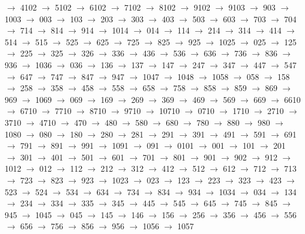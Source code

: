 $\rightarrow$ 4102 $\rightarrow$ 5102 $\rightarrow$ 6102 $\rightarrow$ 7102 $\rightarrow$ 8102 $\rightarrow$ 9102 $\rightarrow$ 9103 $\rightarrow$ 903 $\rightarrow$ 1003 $\rightarrow$ 003 $\rightarrow$ 103 $\rightarrow$ 203 $\rightarrow$ 303 $\rightarrow$ 403 $\rightarrow$ 503 $\rightarrow$ 603 $\rightarrow$ 703 $\rightarrow$ 704 $\rightarrow$ 714 $\rightarrow$ 814 $\rightarrow$ 914 $\rightarrow$ 1014 $\rightarrow$ 014 $\rightarrow$ 114 $\rightarrow$ 214 $\rightarrow$ 314 $\rightarrow$ 414 $\rightarrow$ 514 $\rightarrow$ 515 $\rightarrow$ 525 $\rightarrow$ 625 $\rightarrow$ 725 $\rightarrow$ 825 $\rightarrow$ 925 $\rightarrow$ 1025 $\rightarrow$ 025 $\rightarrow$ 125 $\rightarrow$ 225 $\rightarrow$ 325 $\rightarrow$ 326 $\rightarrow$ 336 $\rightarrow$ 436 $\rightarrow$ 536 $\rightarrow$ 636 $\rightarrow$ 736 $\rightarrow$ 836 $\rightarrow$ 936 $\rightarrow$ 1036 $\rightarrow$ 036 $\rightarrow$ 136 $\rightarrow$ 137 $\rightarrow$ 147 $\rightarrow$ 247 $\rightarrow$ 347 $\rightarrow$ 447 $\rightarrow$ 547 $\rightarrow$ 647 $\rightarrow$ 747 $\rightarrow$ 847 $\rightarrow$ 947 $\rightarrow$ 1047 $\rightarrow$ 1048 $\rightarrow$ 1058 $\rightarrow$ 058 $\rightarrow$ 158 $\rightarrow$ 258 $\rightarrow$ 358 $\rightarrow$ 458 $\rightarrow$ 558 $\rightarrow$ 658 $\rightarrow$ 758 $\rightarrow$ 858 $\rightarrow$ 859 $\rightarrow$ 869 $\rightarrow$ 969 $\rightarrow$ 1069 $\rightarrow$ 069 $\rightarrow$ 169 $\rightarrow$ 269 $\rightarrow$ 369 $\rightarrow$ 469 $\rightarrow$ 569 $\rightarrow$ 669 $\rightarrow$ 6610 $\rightarrow$ 6710 $\rightarrow$ 7710 $\rightarrow$ 8710 $\rightarrow$ 9710 $\rightarrow$ 10710 $\rightarrow$ 0710 $\rightarrow$ 1710 $\rightarrow$ 2710 $\rightarrow$ 3710 $\rightarrow$ 4710 $\rightarrow$ 470 $\rightarrow$ 480 $\rightarrow$ 580 $\rightarrow$ 680 $\rightarrow$ 780 $\rightarrow$ 880 $\rightarrow$ 980 $\rightarrow$ 1080 $\rightarrow$ 080 $\rightarrow$ 180 $\rightarrow$ 280 $\rightarrow$ 281 $\rightarrow$ 291 $\rightarrow$ 391 $\rightarrow$ 491 $\rightarrow$ 591 $\rightarrow$ 691 $\rightarrow$ 791 $\rightarrow$ 891 $\rightarrow$ 991 $\rightarrow$ 1091 $\rightarrow$ 091 $\rightarrow$ 0101 $\rightarrow$ 001 $\rightarrow$ 101 $\rightarrow$ 201 $\rightarrow$ 301 $\rightarrow$ 401 $\rightarrow$ 501 $\rightarrow$ 601 $\rightarrow$ 701 $\rightarrow$ 801 $\rightarrow$ 901 $\rightarrow$ 902 $\rightarrow$ 912 $\rightarrow$ 1012 $\rightarrow$ 012 $\rightarrow$ 112 $\rightarrow$ 212 $\rightarrow$ 312 $\rightarrow$ 412 $\rightarrow$ 512 $\rightarrow$ 612 $\rightarrow$ 712 $\rightarrow$ 713 $\rightarrow$ 723 $\rightarrow$ 823 $\rightarrow$ 923 $\rightarrow$ 1023 $\rightarrow$ 023 $\rightarrow$ 123 $\rightarrow$ 223 $\rightarrow$ 323 $\rightarrow$ 423 $\rightarrow$ 523 $\rightarrow$ 524 $\rightarrow$ 534 $\rightarrow$ 634 $\rightarrow$ 734 $\rightarrow$ 834 $\rightarrow$ 934 $\rightarrow$ 1034 $\rightarrow$ 034 $\rightarrow$ 134 $\rightarrow$ 234 $\rightarrow$ 334 $\rightarrow$ 335 $\rightarrow$ 345 $\rightarrow$ 445 $\rightarrow$ 545 $\rightarrow$ 645 $\rightarrow$ 745 $\rightarrow$ 845 $\rightarrow$ 945 $\rightarrow$ 1045 $\rightarrow$ 045 $\rightarrow$ 145 $\rightarrow$ 146 $\rightarrow$ 156 $\rightarrow$ 256 $\rightarrow$ 356 $\rightarrow$ 456 $\rightarrow$ 556 $\rightarrow$ 656 $\rightarrow$ 756 $\rightarrow$ 856 $\rightarrow$ 956 $\rightarrow$ 1056 $\rightarrow$ 1057 